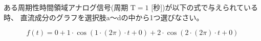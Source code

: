ある周期性時間領域アナログ信号(周期 $\textrm{T} = 1$ [秒])が以下の式で与えられている時、
直流成分のグラフを選択肢a〜dの中から1つ選びなさい。

\[
f(t) = 
 0
+1 \cdot \cos( 1 \cdot (2 \pi) \cdot t + 0 )
+2 \cdot \cos( 2 \cdot (2 \pi) \cdot t + 0 )
\]
